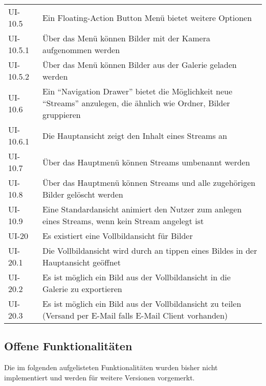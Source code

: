 \begin{center}
\begin{longtable}{|l|p{12cm}|}
UI-10.5 &  Ein Floating-Action Button Menü bietet weitere Optionen\\
UI-10.5.1 &  Über das Menü können Bilder mit der Kamera aufgenommen werden\\
UI-10.5.2 &  Über das Menü können Bilder aus der Galerie geladen werden\\
UI-10.6 & Ein \enquote{Navigation Drawer} bietet die Möglichkeit neue \enquote{Streams} anzulegen, die ähnlich wie Ordner, Bilder gruppieren\\
UI-10.6.1 & Die Hauptansicht zeigt den Inhalt eines Streams an\\
UI-10.7 & Über das Hauptmenü können Streams umbenannt werden\\
UI-10.8 & Über das Hauptmenü können Streams und alle zugehörigen Bilder gelöscht werden\\
UI-10.9 & Eine Standardansicht animiert den Nutzer zum anlegen eines Streams, wenn kein Stream angelegt ist\\
\hline
UI-20 &  Es existiert eine Vollbildansicht für Bilder\\
UI-20.1 & Die Vollbildansicht wird durch an tippen eines Bildes in der Hauptansicht geöffnet\\
UI-20.2 & Es ist möglich ein Bild aus der Vollbildansicht in die Galerie zu exportieren\\
UI-20.3 & Es ist möglich ein Bild aus der Vollbildansicht zu teilen (Versand per E-Mail falls E-Mail Client vorhanden)\\
\hline
\end{longtable}
\end{center}

\subsection{Offene Funktionalitäten}

Die im folgenden aufgelisteten Funktionalitäten wurden bisher nicht implementiert und werden für weitere Versionen vorgemerkt.

